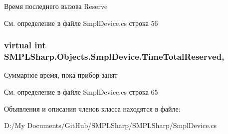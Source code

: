 Время последнего вызова Reserve 



См. определение в файле Smpl\-Device.\-cs строка 56

\hypertarget{class_s_m_p_l_sharp_1_1_objects_1_1_smpl_device_afe478b9c4ec74e462f5af5d3a51f4131}{
\subsubsection[{Time\-Total\-Reserved}]{\setlength{\rightskip}{0pt plus 5cm}virtual int S\-M\-P\-L\-Sharp.\-Objects.\-Smpl\-Device.\-Time\-Total\-Reserved\hspace{0.3cm}{\ttfamily [get]}, {\ttfamily [set]}}}\label{d7/d39/class_s_m_p_l_sharp_1_1_objects_1_1_smpl_device_afe478b9c4ec74e462f5af5d3a51f4131}


Суммарное время, пока прибор занят 



См. определение в файле Smpl\-Device.\-cs строка 65



Объявления и описания членов класса находятся в файле\-:\begin{DoxyCompactItemize}
\item 
D\-:/\-My Documents/\-Git\-Hub/\-S\-M\-P\-L\-Sharp/\-S\-M\-P\-L\-Sharp/Smpl\-Device.\-cs\end{DoxyCompactItemize}
